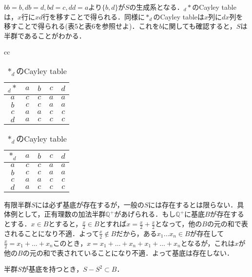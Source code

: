 $bb=b,db=d,bd=c,dd=a$より$\{b,d\}$が$S$の生成系となる．$_{d}*$のCayley tableは，$x$行に$xd$行を移すことで得られる．同様に$*_{d}$のCayley tableは$x$列に$dx$列を移すことで得られる(表5と表6を参照せよ)．これを$b$に関しても確認すると，$S$は半群であることがわかる．
\begin{table}[htbp]
\begin{center}
\begin{tabular}{cc}
\begin{minipage}{0.5\hsize}
\begin{center}
\begin{tabular}{c|cccc}
$_{d}*$&$a$&$b$&$c$&$d$ \\ \hline
$a$&$c$&$c$&$a$&$a$ \\
$b$&$c$&$c$&$a$&$a$ \\
$c$&$a$&$a$&$c$&$c$ \\
$d$&$a$&$c$&$c$&$c$  
\end{tabular}
\caption{$_{d}*$のCayley table}
\end{center}
\end{minipage}
\begin{minipage}{0.5\hsize}
\begin{center}
\begin{tabular}{c|cccc}
$*_d$&$a$&$b$&$c$&$d$ \\ \hline
$a$&$c$&$c$&$a$&$a$ \\
$b$&$c$&$c$&$a$&$a$ \\
$c$&$a$&$a$&$c$&$c$ \\
$d$&$a$&$c$&$c$&$c$ 
\end{tabular}
\caption{$*_d$のCayley table}
\end{center}
\end{minipage}
\end{tabular}
\end{center}
\end{table}
有限半群$S$には必ず基底が存在するが，一般の$S$には存在するとは限らない．具体例として，正有理数の加法半群$\mathbb Q^{+}$があげられる．もし$\mathbb Q^{+}$に基底$B$が存在するとする．$x\in B$とすると，$\frac{x}{2}\in B$とすれば$x=\frac{x}{2}+\frac{x}{2}$となって，他の$B$の元の和で表されることになり不適．よって$\frac{x}{2}\notin B$だから，ある$x_1\dots x_n\in B$が存在して$\frac{x}{2}=x_1+\dots+x_n$このとき，$x=x_1+\dots+x_n+x_1+\dots+x_n$となるが，これは$x$が他の$B$の元の和で表されていることになり不適．よって基底は存在しない．
\begin{slem}
半群$S$が基底を持つとき，$S-S^2\subset B$．
\end{slem}
